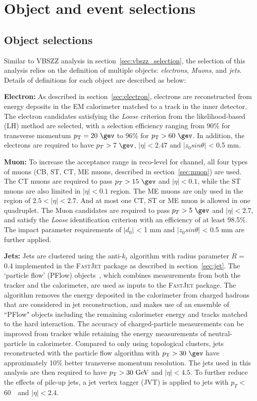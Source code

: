 \section{Object and event selections}
\label{sec:hmhzz_selection}

\subsection{Object selections}
\label{sec:hmhzz_objsel}

Similar to VBSZZ analysis in section~\ref{sec:vbszz_selection}, the selection of this analysis relies on the definition of multiple objects: \textit{electrons}, \textit{Muons}, and \textit{jets}.
Details of definitions for each object are described as below:

\textbf{Electron:}
As described in section~\ref{sec:electron}, electrons are reconstructed from energy deposits in the EM calorimeter matched to a track in the inner detector.
The electron candidates satisfying the \textit{Loose} criterion from the likelihood-based (LH) method are selected,
with a selection efficiency ranging from 90\% for transverse momentum $\pt = 20~\gev$ to 96\% for $\pt > 60~\gev$.
In addition, the electrons are required to have $p_{T} > 7~\gev$, $|\eta| < 2.47$ and $|z_{0} sin\theta|$ < 0.5 mm.

\textbf{Muon:}
To increase the acceptance range in reco-level for \llll channel, all four types of muons
(CB, ST, CT, ME muons, described in section~\ref{sec:muon}) are used.
The CT muons are required to pass $p_{T} > 15~\gev$ and $|\eta| < 0.1$, while the ST muons are also limited in $|\eta| < 0.1$ region.
The ME muons are only used in the region of $2.5 < |\eta| < 2.7$.
And at most one CT, ST or ME muon is allowed in one \llll quadruplet.
The Muon candidates are required to pass $p_{T} > 5~\gev$ and $|\eta| < 2.7$,
and satisfy the \textit{Loose} identification criterion with an efficiency of at least 98.5\%.
The impact parameter requirements of $|d_{0}|$ < 1 mm and $|z_{0} sin\theta|$ < 0.5 mm are further applied.

\textbf{Jets:}
Jets are clustered using the anti-$k_t$ algorithm with radius parameter $R$ = 0.4 implemented in the \textsc{FastJet} package as described in section~\ref{sec:jet}. 
The `particle flow' (PFlow) objects~\cite{PERF-2015-09}, which combines measurements from both the tracker and the calorimeter, are used as inputs to the \textsc{FastJet} package.
The algorithm removes the energy deposited in the calorimeter from charged hadrons that are considered in jet reconstruction, and makes use of an ensemble of ``PFlow" objects including  
the remaining calorimeter energy and tracks matched to the hard interaction.
The accuracy of charged-particle measurements can be improved from tracker while retaining the energy measurements of neutral-particle in calorimeter.
Compared to only using topological clusters, jets reconstructed with the particle flow algorithm with $\pt > 30~\gev$ have approximately 10\% better transverse momentum resolution.
The jets used in this analysis are then required to have $p_{\text{T}} > 30~\text{Ge\kern -0.1em V}$ and $|\eta | < 4.5$.
To further reduce the effects of pile-up jets, a jet vertex tagger (JVT) is applied to jets with $p_{T} <$ 60~\gev~and $|\eta| < 2.4$.

